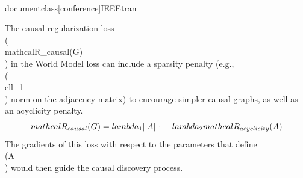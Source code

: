\\documentclass[conference]{IEEEtran}
\begin{document}
The causal regularization loss \\(\\mathcal{R}_{causal}(G)\\) in the World Model loss can include a sparsity penalty (e.g., \\(\\ell_1\\) norm on the adjacency matrix) to encourage simpler causal graphs, as well as an acyclicity penalty.
$$
\\mathcal{R}_{causal}(G) = \\lambda_1 ||A||_1 + \\lambda_2 \\mathcal{R}_{acyclicity}(A)
$$
The gradients of this loss with respect to the parameters that define \\(A\\) would then guide the causal discovery process.
\end{document}

